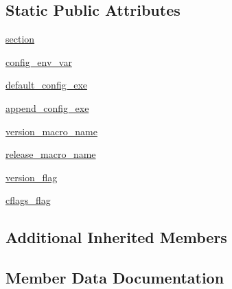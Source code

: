 \subsection*{Static Public Attributes}
\begin{DoxyCompactItemize}
\item 
\hyperlink{classnumpy_1_1distutils_1_1system__info_1_1wx__info_aded3a3efaf6d9e3496ebad936017d43f}{section}
\item 
\hyperlink{classnumpy_1_1distutils_1_1system__info_1_1wx__info_a21faa3f2d0307961aa6ea60e25b59af4}{config\+\_\+env\+\_\+var}
\item 
\hyperlink{classnumpy_1_1distutils_1_1system__info_1_1wx__info_ab60412ad23849a3441ccfdea323b9f0e}{default\+\_\+config\+\_\+exe}
\item 
\hyperlink{classnumpy_1_1distutils_1_1system__info_1_1wx__info_ae08389831063153ff66a882ba685d401}{append\+\_\+config\+\_\+exe}
\item 
\hyperlink{classnumpy_1_1distutils_1_1system__info_1_1wx__info_a0b28360ea7be273d2d065a7b3d1b2c16}{version\+\_\+macro\+\_\+name}
\item 
\hyperlink{classnumpy_1_1distutils_1_1system__info_1_1wx__info_a9f7bf84b39e806321aa6a219215aa1a5}{release\+\_\+macro\+\_\+name}
\item 
\hyperlink{classnumpy_1_1distutils_1_1system__info_1_1wx__info_ad63fbb6b093a9c0de9b786bae73749d3}{version\+\_\+flag}
\item 
\hyperlink{classnumpy_1_1distutils_1_1system__info_1_1wx__info_a3469d47fb84742c5d74fa551750f8054}{cflags\+\_\+flag}
\end{DoxyCompactItemize}
\subsection*{Additional Inherited Members}


\subsection{Member Data Documentation}
\mbox{\label{classnumpy_1_1distutils_1_1system__info_1_1wx__info_ae08389831063153ff66a882ba685d401}} 
